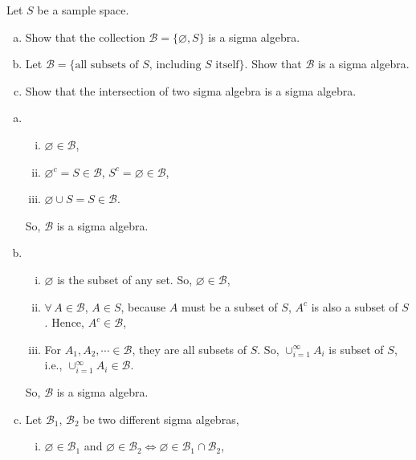 \documentclass[14pt]{elegantbook}
\begin{document}
    \setcounter{exer}{10}
    \begin{exercise}
        Let $S$ be a sample space. 
        \begin{enumerate}[(a)]
            \item Show that the collection $\mathcal{B}=\{\varnothing, S\}$ is a sigma algebra. 
            \item Let $\mathcal{B}=\{\text{all subsets of $S$, including $S$ itself}\}$. Show that $\mathcal{B}$ is a sigma algebra. 
            \item Show that the intersection of two sigma algebra is a sigma algebra.
        \end{enumerate}
    \end{exercise}

    \begin{solution}
        \begin{enumerate}[(a)]
            \item \begin{enumerate}[(i)]
                \item $\varnothing \in \mathcal{B}$, 
                \item $\varnothing^c=S\in\mathcal{B}$, $S^c=\varnothing\in\mathcal{B}$, 
                \item $\varnothing\cup S=S\in\mathcal{B}$.
            \end{enumerate}
            So, $\mathcal{B}$ is a sigma algebra. 
            \item \begin{enumerate}[(i)]
                \item $\varnothing$ is the subset of any set. So, $\varnothing\in\mathcal{B}$, 
                \item $\forall\,A\in\mathcal{B}$, $A\in S$, because $A$ must be a subset of $S$, $A^c$ is also a subset of $S$. Hence, $A^c\in\mathcal{B}$, 
                \item For $A_1, A_2, \cdots \in\mathcal{B}$, they are all subsets of $S$. So, $\cup_{i=1}^\infty A_i$ is subset of $S$, i.e., $\cup_{i=1}^\infty A_i\in\mathcal{B}$. 
            \end{enumerate}
            So, $\mathcal{B}$ is a sigma algebra. 
            \item Let $\mathcal{B}_1$, $\mathcal{B}_2$ be two different sigma algebras, 
            \begin{enumerate}[(i)]
                \item $\varnothing\in\mathcal{B}_1$ and $\varnothing\in\mathcal{B}_2\Leftrightarrow\varnothing\in\mathcal{B}_1\cap\mathcal{B}_2$,  

\end{enumerate}
\end{enumerate}
\end{solution}
\end{document}
